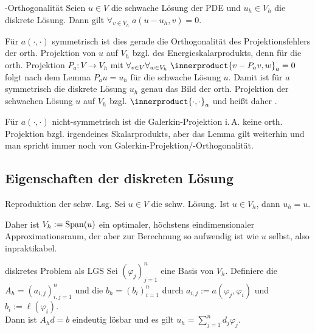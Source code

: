 \linie

\begin{Lemma}{-Orthogonalität}
    Seien $u \in V$ die schwache Lösung der PDE und
    $u_h \in V_h$ die diskrete Lösung.
    Dann gilt $\forall_{v \in V_h}\; a(u - u_h, v) = 0$.
\end{Lemma}

\begin{Bem}
    Für $a(\cdot, \cdot)$ symmetrisch ist dies gerade die Orthogonalität des
    Projektionsfehlers der orth. Projektion von $u$ auf $V_h$ bzgl. des Energieskalarprodukts,
    denn für die orth. Projektion $P_a\colon V \to V_h$ mit
    $\forall_{v \in V} \forall_{w \in V_h}\; \innerproduct{v - P_a v, w}_a = 0$
    folgt nach dem Lemma $P_a u = u_h$ für die schwache Lösung $u$.
    Damit ist für $a$ symmetrisch die diskrete Lösung $u_h$ genau das Bild der
    orth. Projektion der schwachen Lösung $u$ auf $V_h$ bzgl. $\innerproduct{\cdot, \cdot}_a$
    und heißt daher .

    Für $a(\cdot, \cdot)$ nicht-symmetrisch ist die Galerkin-Projektion i.\,A.
    keine orth. Projektion bzgl. irgendeines Skalarprodukts,
    aber das Lemma gilt weiterhin und man spricht immer noch von
    Galerkin-Projektion/-Orthogonalität.
\end{Bem}

\subsection{%
    Eigenschaften der diskreten Lösung%
}

\begin{Lemma}{Reproduktion der schw. Lsg.}
    Sei $u \in V$ die schw. Lösung.
    Ist $u \in V_h$, dann $u_h = u$.
\end{Lemma}

\begin{Bem}
    Daher ist $V_h := \operatorname{Span}(u)$ ein optimaler, höchstens eindimensionaler Approximationsraum,
    der aber zur Berechnung so aufwendig ist wie $u$ selbst, also inpraktikabel.
\end{Bem}

\linie

\begin{Satz}{diskretes Problem als LGS}
    Sei $(\varphi_j)_{j=1}^n$ eine Basis von $V_h$.
    Definiere die  $A_h = (a_{i,j})_{i,j=1}^n$
    und die  $b_h = (b_i)_{i=1}^n$ durch
    $a_{i,j} := a(\varphi_j, \varphi_i)$ und $b_i := \ell(\varphi_i)$.\\
    Dann ist $A_h d = b$ eindeutig lösbar und es gilt $u_h = \sum_{j=1}^n d_j \varphi_j$.
\end{Satz}

